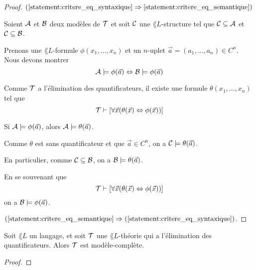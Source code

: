 \documentclass[a4paper, 12pt]{report}
\begin{document}
\ifdefined\outputproof
\begin{proof}
	$(\ref{statement:critere_eq_syntaxique} \implies
	\ref{statement:critere_eq_semantique})$

	Soient $\struct{A}$ et $\struct{B}$ deux modèles de $\theory{T}$ et soit
	$\struct{C}$ une $\lang{L}$-structure tel que $\struct{C} \substructure
	\struct{A}$ et $\struct{C} \substructure \struct{B}$.

	Prenons une $\lang{L}$-formule $\phi(x_{1}, \dots, x_{n})$ et un $n$-uplet
	$\vec{a} = (a_{1}, \dots, a_{n}) \in C^{n}$.
	Nous devons montrer
	\begin{equation}
		\struct{A} \models \phi(\vec{a}) \Leftrightarrow \struct{B} \models
		\phi(\vec{a})
	\end{equation}

	Comme $\theory{T}$ a l'élimination des quantificateurs, il existe une
	formule $\theta(x_{1}, \dots, x_{n})$ tel que
	\begin{equation}
		\theory{T} \satisfies [\forall \vec{x} (\theta(\vec{x}) \Leftrightarrow
		\phi(\vec{x}))]
	\end{equation}

	Si $\struct{A} \models \phi(\vec{a})$, alors $\struct{A} \models
	\theta(\vec{a})$.

	Comme $\theta$ est sans quantificateur et que $\vec{a} \in C^{n}$, on a
	$\struct{C} \models \theta(\vec{a})$.

	En particulier, comme $\struct{C} \substructure \struct{B}$, on a
	$\struct{B} \models \theta(\vec{a})$.

	En se souvenant que
	\begin{equation}
		\theory{T} \satisfies [\forall \vec{x} (\theta(\vec{x}) \Leftrightarrow
		\phi(\vec{x}))]
	\end{equation}
	on a $\struct{B} \models \phi(\vec{a})$.

	$(\ref{statement:critere_eq_semantique} \implies
	(\ref{statement:critere_eq_syntaxique})$.
\end{proof}
\fi

\begin{proposition}
	Soit $\lang{L}$ un langage, et soit $\theory{T}$ une $\lang{L}$-théorie
	qui a l'élimination des quantificateurs. Alors $\theory{T}$ est
	modèle-complète.
\end{proposition}

\ifdefined\outputproof
\begin{proof}

\end{proof}
\fi
\end{document}

